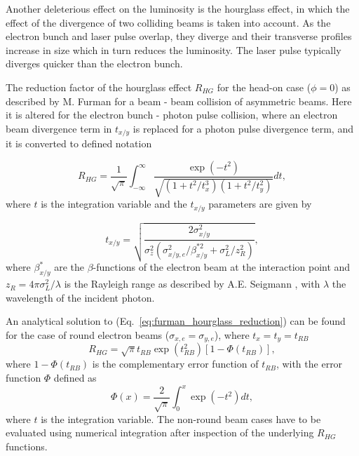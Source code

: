 \documentclass[../main.tex]{subfiles}
\begin{document}
Another deleterious effect on the luminosity is the hourglass effect, in which the effect of the divergence of two colliding beams is taken into account. As the electron bunch and laser pulse overlap, they diverge and their transverse profiles increase in size which in turn reduces the luminosity. The laser pulse typically diverges quicker than the electron bunch. 

The reduction factor of the hourglass effect $R_{HG}$ for the head-on case ($\phi = 0$) as described by M. Furman \cite{furman1991hourglass} for a beam - beam collision of asymmetric beams. Here it is altered for the electron bunch - photon pulse collision, where an electron beam divergence term in $t_{x/y}$ is replaced for a photon pulse divergence term, and it is converted to defined notation 

\begin{equation}
R_{HG} = \frac{1}{\sqrt{\pi}}\int_{-\infty}^{\infty}\frac{\exp\left(-t^{2}\right)}{\sqrt{\left(1+t^{2}/t_{x}^{3}\right)\left(1+t^{2}/t_{y}^{2}\right)}}dt,
\label{eq:furman_hourglass_reduction}    
\end{equation}
where $t$ is the integration variable and the $t_{x/y}$ parameters are given by

\begin{equation}
t_{x/y} = \sqrt{\frac{2\sigma_{x/y}^{2}}{\sigma_{z}^{2}\left(\sigma_{x/y,e}^{2}/\beta_{x/y}^{*2}+\sigma_{L}^{2}/z_{R}^{2}\right)}},
\label{eq:furman_txy_parameters}    
\end{equation}
where $\beta_{x/y}^{*}$ are the $\beta$-functions of the electron beam at the interaction point and $z_{R}=4\pi\sigma_{L}^{2}/\lambda$ is the Rayleigh range as described by A.E. Seigmann \cite{siegmann1986lasers}, with $\lambda$ the wavelength of the incident photon.

An analytical solution to (Eq.~\ref{eq:furman_hourglass_reduction}) can be found for the case of round electron beams ($\sigma_{x,e}=\sigma_{y,e}$), where $t_{x}=t_{y}=t_{RB}$
\begin{equation}
R_{HG} = \sqrt{\pi}t_{RB}\exp\left(t_{RB}^{2}\right)\left[1-\Phi\left(t_{RB}\right)\right],
\label{eq:furman_hourglass_reduction_analytical}    
\end{equation}
where $1-\Phi\left(t_{RB}\right)$ is the complementary error function of $t_{RB}$, with the error function $\Phi$ defined as
\begin{equation}
\Phi\left(x\right) = \frac{2}{\sqrt{\pi}}\int_{0}^{x}\exp\left(-t^{2}\right)dt,
\label{eq:error_function}    
\end{equation}
where $t$ is the integration variable. The non-round beam cases have to be evaluated using numerical integration after inspection of the underlying $R_{HG}$ functions.
\end{document}
